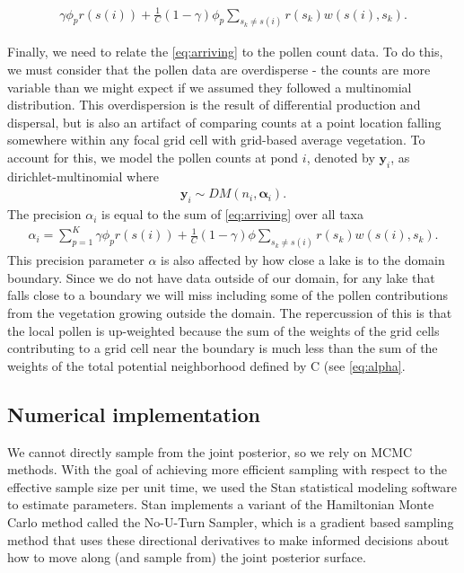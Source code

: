 \documentclass[12pt]{article}
\begin{document}
\begin{align}
\gamma \phi_p r(s(i)) + \frac{1}{C} (1-\gamma) \phi_p \sum_{s_k \neq s(i) } r(s_k) w(s(i), s_k).
\label{eq:arriving}
\end{align}

Finally, we need to relate the \ref{eq:arriving} to the pollen count data. To do this, we must consider that the pollen data are overdisperse - the counts are more variable than we might expect if we assumed they followed a  multinomial distribution. This overdispersion is the result of differential production and dispersal, but is also an artifact of comparing counts at a point location falling somewhere within any focal grid cell with grid-based average vegetation. To account for this, we model the pollen counts at pond $i$, denoted by $\bm{y}_i$, as
dirichlet-multinomial where 
\begin{align}
\bm{y}_i \sim DM (n_i, \bm{\alpha}_i).
\label{eq:DM}
\end{align}
The precision $\alpha_i$ is equal to the sum of \ref{eq:arriving} over all taxa
\begin{align}
\alpha_i = \sum_{p=1}^K \gamma \phi_p r(s(i)) + \frac{1}{C} (1-\gamma) \phi \sum_{s_k \neq s(i) } r(s_k) w(s(i), s_k).
\label{eq:alpha}
\end{align}
This precision parameter $\alpha$ is also affected by how close a lake is to the domain boundary. Since we do not have data outside of our domain, for any lake that falls close to a boundary we will miss including some of the pollen contributions from the vegetation growing outside the domain. The repercussion of this is that the local pollen is up-weighted because the sum of the weights of the grid cells contributing to a grid cell near the boundary is much less than the sum of the weights of the total potential neighborhood defined by C (see \ref{eq:alpha}. 

\subsection{Numerical implementation}

We cannot directly sample from the joint posterior, so we rely on MCMC
methods. With the goal of achieving more efficient sampling with
respect to the effective sample size per unit time, we used the Stan
statistical modeling software to estimate parameters. Stan implements
a variant of the Hamiltonian Monte Carlo method called the No-U-Turn
Sampler, which is a gradient based sampling method that uses these
directional derivatives to make informed decisions about how to move
along (and sample from) the joint posterior surface.
\end{document}
